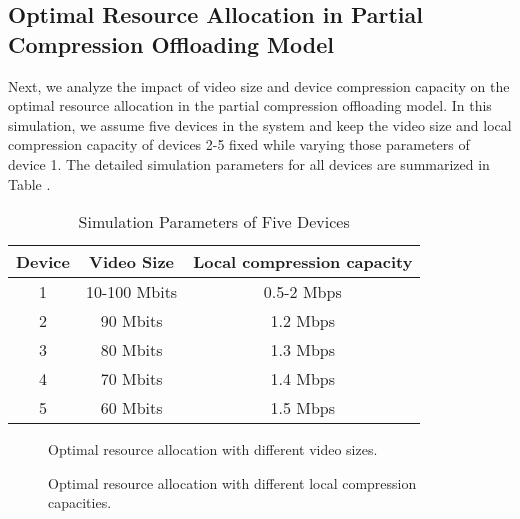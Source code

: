 \documentclass[journal,draftcls,onecolumn,12pt,twoside]{IEEEtran}
\begin{document}
\subsection{Optimal Resource Allocation in Partial Compression Offloading Model}
Next, we analyze the impact of video size and device compression capacity on the optimal resource allocation in the partial compression offloading model. In this simulation, we assume five devices in the system and keep the video size and local compression capacity of devices 2-5 fixed while varying those parameters of device 1. The detailed simulation parameters for all devices are summarized in Table \uppercase\expandafter{}.
\begin{table}[!htp]
\caption{Simulation Parameters of Five Devices}
\centering
\vspace{-2em}
\begin{tabular}[t]{|c|c|c|}
	\hline
	Device & Video Size  & Local compression capacity\\
	\hline
	\hline
	1	&10-100 Mbits &0.5-2 Mbps\\
	\hline
	2	&90 Mbits  	&1.2 Mbps\\
	\hline
	3	&80 Mbits	&1.3 Mbps\\
	\hline
	4	&70 Mbits	&1.4 Mbps\\
	\hline
	5	&60 Mbits	&1.5 Mbps\\
    \hline
\end{tabular}
\end{table}
\begin{figure}
	\centering
	\caption{Optimal resource allocation with different video sizes.}\label{Resource_L}
\end{figure}
\begin{figure}
	\centering
	\caption{Optimal resource allocation with different local compression capacities.}\label{Resource_Vd}
\end{figure}
\end{document}
